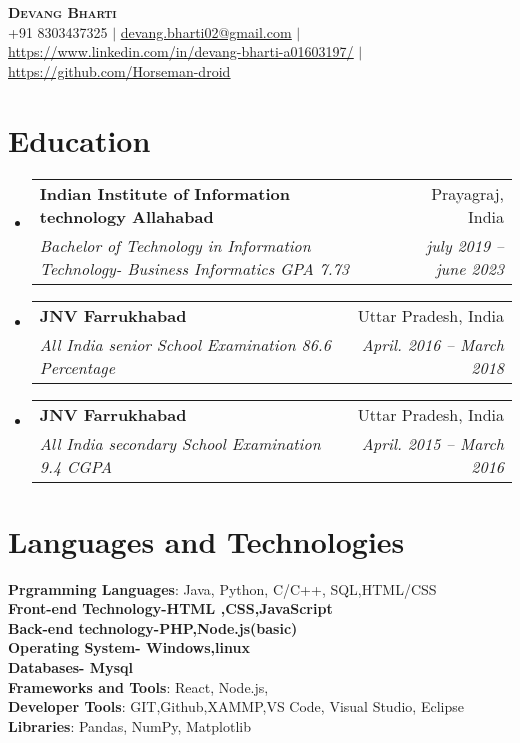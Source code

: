 \documentclass[letterpaper,11pt]{article}
\makeatletter
\newcommand{\resumeSubheading}[4]{
  \vspace{-2pt}\item
    \begin{tabular*}{0.97\textwidth}[t]{l@{\extracolsep{\fill}}r}
      \textbf{#1} & #2 \\
      \textit{\small#3} & \textit{\small #4} \\
    \end{tabular*}\vspace{-7pt}
}
\newcommand{\resumeSubHeadingListStart}{\begin{itemize}[leftmargin=0.15in, label={}]}
\newcommand{\resumeSubHeadingListEnd}{\end{itemize}}
\makeatother
\begin{document}

\begin{center}
    \textbf{\Huge \scshape Devang Bharti} \\ \vspace{1pt}
    \small +91 8303437325 $|$ \href{mailto:devang.bharti02@gmail.com}{\underline{devang.bharti02@gmail.com}} $|$ 
    \href{https://linkedin.com/in/...}{\underline{https://www.linkedin.com/in/devang-bharti-a01603197/}} $|$
    \href{https://github.com/...}{\underline{https://github.com/Horseman-droid}}
\end{center}


\section{Education}
  \resumeSubHeadingListStart
    \resumeSubheading
      {Indian Institute of Information technology Allahabad}{Prayagraj, India}
      {Bachelor of Technology in Information Technology- Business Informatics GPA 7.73}{july 2019 -- june 2023}
    \resumeSubheading
      {JNV Farrukhabad}{Uttar Pradesh, India}
      {All India senior School Examination 86.6 Percentage}{April. 2016 -- March 2018}
      \resumeSubheading
      {JNV Farrukhabad}{Uttar Pradesh, India}
      {All India secondary School Examination 9.4 CGPA}{April. 2015 -- March 2016}
  \resumeSubHeadingListEnd


%
\section{Languages and Technologies}
 \begin{itemize}[leftmargin=0.15in, label={}]
    \small{\item{
     \textbf{Prgramming Languages}{: Java, Python, C/C++, SQL,HTML/CSS} \\
     \textbf{Front-end Technology-HTML ,CSS,JavaScript}\\
     \textbf{Back-end technology-PHP,Node.js(basic)}\\
     \textbf{Operating System- Windows,linux}\\
     \textbf{Databases- Mysql}\\
     \textbf{Frameworks and Tools}{: React, Node.js,} \\
     \textbf{Developer Tools}{: GIT,Github,XAMMP,VS Code, Visual Studio, Eclipse} \\
     \textbf{Libraries}{: Pandas, NumPy, Matplotlib}
    }}
 \end{itemize}
\end{document}
